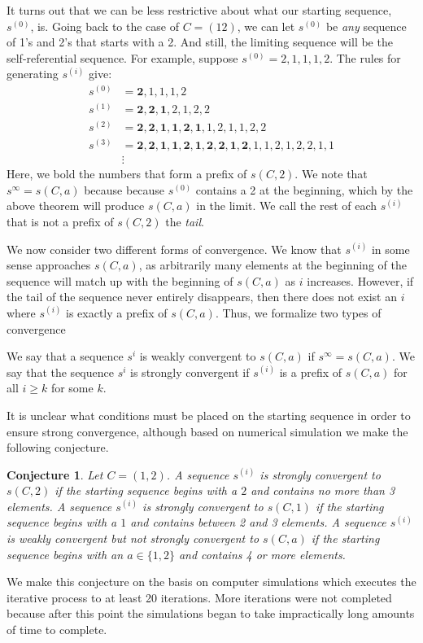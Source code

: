 \documentclass[runningheads,a4paper]{llncs}
\newtheorem{conj}[theorem]{Conjecture}
\begin{document}
It turns out that we can be less restrictive about what our starting sequence, $s^{(0)}$, is. Going back to the case of $C = (1 2)$, we can let $s^{(0)}$ be \emph{any} sequence of 1's and 2's that starts with a 2. And still, the limiting sequence will be the self-referential sequence.
For example, suppose $s^{(0)} = 2,1,1,1,2$. The rules for generating $s^{(i)}$ give:
\begin{align*}
s^{(0)}&= \mathbf{2},1,1,1,2\\
s^{(1)} &= \mathbf{2,2,1},2,1,2,2\\
s^{(2)} &= \mathbf{2,2,1,1,2,1},1,2,1,1,2,2\\
s^{(3)} &= \mathbf{2,2,1,1,2,1,2,2,1,2},1,1,2,1,2,2,1,1\\
&\vdots
\end{align*}
Here, we bold the numbers that form a prefix of $s(C,2)$. We note that $s^\infty = s(C,a)$ because because $s^{(0)}$ contains a 2 at the beginning, which by the above theorem will produce $s(C,a)$ in the limit. We call the rest of each $s^{(i)}$ that is not a prefix of $s(C,2)$ the \emph{tail}.

We now consider two different forms of convergence. We know that $s^{(i)}$ in some sense approaches $s(C,a)$, as arbitrarily many elements at the beginning of the sequence will match up with the beginning of $s(C,a)$ as $i$ increases. However, if the tail of the sequence never entirely disappears, then there does not exist an $i$ where $s^{(i)}$ is exactly a prefix of $s(C,a)$. Thus, we formalize two types of convergence
\begin{definition} We say that a sequence $s^{i}$ is weakly convergent to $s(C,a)$ if $s^\infty = s(C,a)$. We say that the sequence $s^{i}$ is strongly convergent if $s^{(i)}$ is a prefix of $s(C,a)$ for all $i \geq k$ for some $k$.
\end{definition}
It is unclear what conditions must be placed on the starting sequence in order to ensure strong convergence, although based on numerical simulation we make the following conjecture. 

\begin{conj} Let $C = (1,2)$. A sequence $s^{(i)}$ is strongly convergent to $s(C, 2)$ if the starting sequence begins with a $2$ and contains no more than 3 elements. A sequence $s^{(i)}$ is strongly convergent to $s(C, 1)$ if the starting sequence begins with a $1$ and contains between 2 and 3 elements. A sequence $s^{(i)}$ is weakly convergent but not strongly convergent to $s(C, a)$ if the starting sequence begins with an $a \in \{1,2\}$ and contains 4 or more elements.
\end{conj} 
We make this conjecture on the basis on computer simulations which executes the iterative process to at least 20 iterations. More iterations were not completed because after this point the simulations began to take impractically long amounts of time to complete. 
\end{document}
